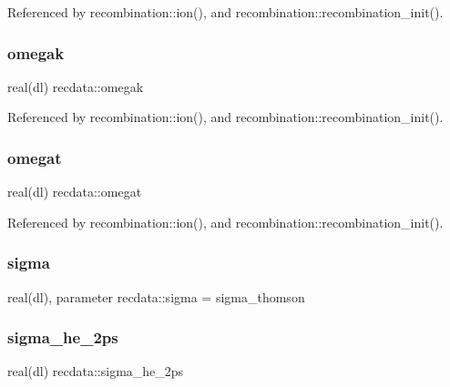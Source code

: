 Referenced by recombination\+::ion(), and recombination\+::recombination\+\_\+init().

\mbox{\label{namespacerecdata_ad15940a7af68a80f1c36cd8e55395adf}} 
\subsubsection{\texorpdfstring{omegak}{omegak}}
{\footnotesize\ttfamily real(dl) recdata\+::omegak}



Referenced by recombination\+::ion(), and recombination\+::recombination\+\_\+init().

\mbox{\label{namespacerecdata_a1b83b45446a75acd6c94310302246fd6}} 
\subsubsection{\texorpdfstring{omegat}{omegat}}
{\footnotesize\ttfamily real(dl) recdata\+::omegat}



Referenced by recombination\+::ion(), and recombination\+::recombination\+\_\+init().

\mbox{\label{namespacerecdata_ad6030407673dc2717b2b8fb28662bd2e}} 
\subsubsection{\texorpdfstring{sigma}{sigma}}
{\footnotesize\ttfamily real(dl), parameter recdata\+::sigma = sigma\+\_\+thomson}

\mbox{\label{namespacerecdata_af22595aa05fb59f5a5b0b8d55c3c5125}} 
\subsubsection{\texorpdfstring{sigma\+\_\+he\+\_\+2ps}{sigma\_he\_2ps}}
{\footnotesize\ttfamily real(dl) recdata\+::sigma\+\_\+he\+\_\+2ps}



